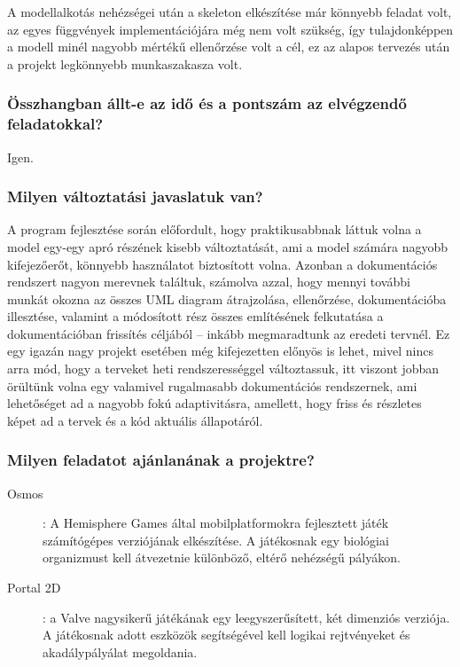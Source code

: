 A modellalkotás nehézségei után a skeleton elkészítése már könnyebb feladat volt, az egyes függvények implementációjára még nem volt szükség, így tulajdonképpen a modell minél nagyobb mértékű ellenőrzése volt a cél, ez az alapos tervezés után a projekt legkönnyebb munkaszakasza volt.
		
		\subsubsection*{Összhangban állt-e az idő és a pontszám az elvégzendő feladatokkal?}
Igen.
		
		\subsubsection*{Milyen változtatási javaslatuk van?}
		A program fejlesztése során előfordult, hogy praktikusabbnak láttuk volna a model egy-egy apró részének kisebb változtatását, ami a model számára nagyobb kifejezőerőt, könnyebb használatot biztosított volna. Azonban a dokumentációs rendszert nagyon merevnek találtuk, számolva azzal, hogy mennyi további munkát okozna az összes UML diagram átrajzolása, ellenőrzése, dokumentációba illesztése, valamint a módosított rész összes említésének felkutatása a dokumentációban frissítés céljából -- inkább megmaradtunk az eredeti tervnél. Ez egy igazán nagy projekt esetében még kifejezetten előnyös is lehet, mivel nincs arra mód, hogy a terveket heti rendszerességgel változtassuk, itt viszont jobban örültünk volna egy valamivel rugalmasabb dokumentációs rendszernek, ami lehetőséget ad a nagyobb fokú adaptivitásra, amellett, hogy friss és részletes képet ad a tervek és a kód aktuális állapotáról.
		
		\subsubsection*{Milyen feladatot ajánlanának a projektre?}
		\begin{description}
\item[Osmos]: A Hemisphere Games által mobilplatformokra fejlesztett játék számítógépes verziójának elkészítése. A játékosnak egy biológiai organizmust kell átvezetnie különböző, eltérő nehézségű pályákon.

\item[Portal 2D]: a Valve nagysikerű játékának egy leegyszerűsített, két dimenziós verziója. A játékosnak adott eszközök segítségével kell logikai rejtvényeket és akadálypályálat megoldania.		
        \end{description}
